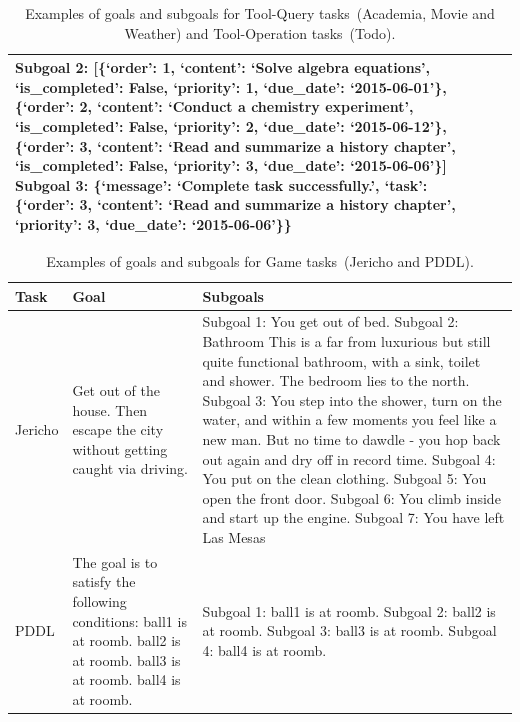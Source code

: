 \begin{table}[t!]
\begin{tabular}{p{2.0cm}p{5.25cm}p{5.25cm}}
Subgoal 2: [\{`order': 1, `content': `Solve algebra equations', `is\_completed': False, `priority': 1, `due\_date': `2015-06-01'\}, \{`order': 2, `content': `Conduct a chemistry experiment', `is\_completed': False, `priority': 2, `due\_date': `2015-06-12'\}, \{`order': 3, `content': `Read and summarize a history chapter', `is\_completed': False, `priority': 3, `due\_date': `2015-06-06'\}] \newline
Subgoal 3: \{`message': `Complete task successfully.', `task': \{`order': 3, `content': `Read and summarize a history chapter', `priority': 3, `due\_date': `2015-06-06'\}\}
\\ 
\bottomrule
\end{tabular}
\caption{Examples of goals and subgoals for Tool-Query tasks~(Academia, Movie and Weather) and Tool-Operation tasks~(Todo).}
\label{tab:subgoal_annotation_3}
\end{table}



\begin{table}[t!]
\centering
\footnotesize
\begin{tabular}{p{2.0cm}p{5.25cm}p{5.25cm}}
\toprule
\textbf{Task} & \textbf{Goal} & \textbf{Subgoals} \\ \midrule
Jericho
&
Get out of the house. Then escape the city without getting caught via driving.
&
Subgoal 1: You get out of bed. \newline
Subgoal 2: Bathroom This is a far from luxurious but still quite functional bathroom, with a sink, toilet and shower. The bedroom lies to the north. \newline
Subgoal 3: You step into the shower, turn on the water, and within a few moments you feel like a new man. But no time to dawdle - you hop back out again and dry off in record time. \newline
Subgoal 4: You put on the clean clothing. \newline
Subgoal 5: You open the front door. \newline
Subgoal 6: You climb inside and start up the engine. \newline
Subgoal 7: You have left Las Mesas
\\
\midrule
PDDL
&
The goal is to satisfy the following conditions: ball1 is at roomb. ball2 is at roomb. ball3 is at roomb. ball4 is at roomb.
&
	
Subgoal 1: ball1 is at roomb. \newline
Subgoal 2: ball2 is at roomb. \newline
Subgoal 3: ball3 is at roomb. \newline
Subgoal 4: ball4 is at roomb.
\\
\bottomrule
\end{tabular}
\caption{Examples of goals and subgoals for Game tasks~(Jericho and PDDL).}
\label{tab:subgoal_annotation_2}
\end{table}



